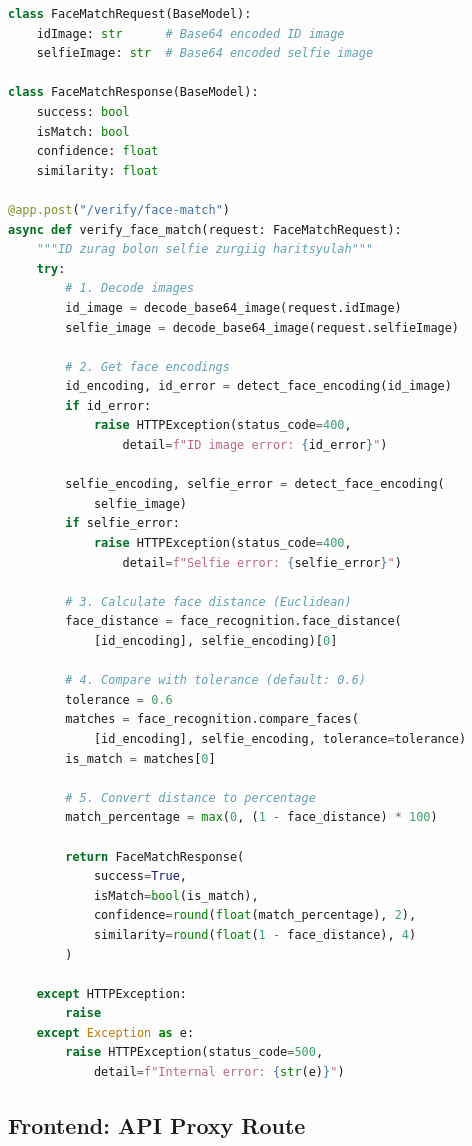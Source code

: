 \documentclass[12pt,a4paper]{article}
\begin{document}
\begin{lstlisting}[language=Python, caption={Face Match Endpoint (main.py)}]
class FaceMatchRequest(BaseModel):
    idImage: str      # Base64 encoded ID image
    selfieImage: str  # Base64 encoded selfie image

class FaceMatchResponse(BaseModel):
    success: bool
    isMatch: bool
    confidence: float
    similarity: float

@app.post("/verify/face-match")
async def verify_face_match(request: FaceMatchRequest):
    """ID zurag bolon selfie zurgiig haritsуulah"""
    try:
        # 1. Decode images
        id_image = decode_base64_image(request.idImage)
        selfie_image = decode_base64_image(request.selfieImage)
        
        # 2. Get face encodings
        id_encoding, id_error = detect_face_encoding(id_image)
        if id_error:
            raise HTTPException(status_code=400, 
                detail=f"ID image error: {id_error}")
        
        selfie_encoding, selfie_error = detect_face_encoding(
            selfie_image)
        if selfie_error:
            raise HTTPException(status_code=400, 
                detail=f"Selfie error: {selfie_error}")
        
        # 3. Calculate face distance (Euclidean)
        face_distance = face_recognition.face_distance(
            [id_encoding], selfie_encoding)[0]
        
        # 4. Compare with tolerance (default: 0.6)
        tolerance = 0.6
        matches = face_recognition.compare_faces(
            [id_encoding], selfie_encoding, tolerance=tolerance)
        is_match = matches[0]
        
        # 5. Convert distance to percentage
        match_percentage = max(0, (1 - face_distance) * 100)
        
        return FaceMatchResponse(
            success=True,
            isMatch=bool(is_match),
            confidence=round(float(match_percentage), 2),
            similarity=round(float(1 - face_distance), 4)
        )
        
    except HTTPException:
        raise
    except Exception as e:
        raise HTTPException(status_code=500, 
            detail=f"Internal error: {str(e)}")
\end{lstlisting}

\subsection{Frontend: API Proxy Route}
\end{document}
